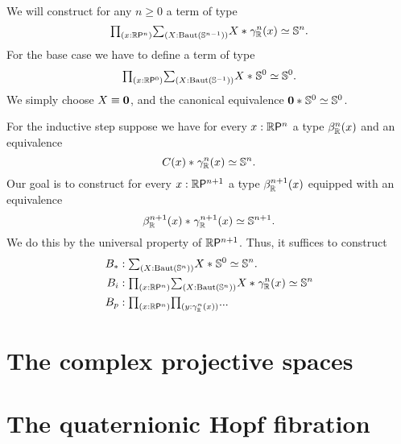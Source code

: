 \begin{constr}
We will construct for any $n\geq 0$ a term of type
\begin{equation*}
\prd{x:\rprojective{n}} \sm{X:\BAut(\sphere{n-1})} \eqv{\join{X}{\tautfam[\R]{n}(x)}}{\sphere{n}}.
\end{equation*}
For the base case we have to define a term of type
\begin{equation*}
\prd{x:\rprojective{0}} \sm{X:\BAut(\sphere{-1})} \eqv{\join{X}{\sphere{0}}}{\sphere{0}}.
\end{equation*}
We simply choose $X\jdeq \emptyt$, and the canonical equivalence $\eqv{\join{\emptyt}{\sphere{0}}}{\sphere{0}}$. 

For the inductive step suppose we have for every $x:\rprojective{n}$ a type $\orthcomp[\R]{n}(x)$ and an equivalence
\begin{equation*}
\eqv{\join{C(x)}{\tautfam[\R]{n}(x)}}{\sphere{n}}.
\end{equation*}
Our goal is to construct for every $x:\rprojective{n+1}$ a type $\orthcomp[\mathbb{R}]{n+1}(x)$ equipped with an equivalence
\begin{equation*}
\eqv{\join{\orthcomp[\mathbb{R}]{n+1}(x)}{\tautfam[\R]{n+1}(x)}}{\sphere{n+1}}.
\end{equation*}
We do this by the universal property of $\rprojective{n+1}$. Thus, it suffices to construct
\begin{align*}
B_{\pt} & : \sm{X:\BAut(\sphere{n})}\eqv{\join{X}{\sphere{0}}}{\sphere{n}}.\\
B_i & : \prd{x:\rprojective{n}}\sm{X:\BAut(\sphere{n})}\eqv{\join{X}{\tautfam[\R]{n}(x)}}{\sphere{n}} \\
B_p & : \prd{x:\rprojective{n}}{y:\tautfam[\R]{n}(x)} ... 
\end{align*}
\end{constr}

\section{The complex projective spaces}

\section{The quaternionic Hopf fibration}
